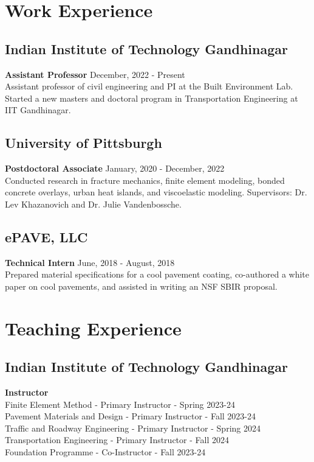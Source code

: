 \documentclass[12pt]{article}
\begin{document}
\bigskip
\section*{Work Experience}
\hfill
\subsection*{Indian Institute of Technology Gandhinagar}
\textbf{Assistant Professor} \hfill December, 2022 - Present \\
Assistant professor of civil engineering and PI at the Built Environment Lab. Started a new masters and doctoral program in Transportation Engineering at IIT Gandhinagar. \\

\subsection*{University of Pittsburgh}
\textbf{Postdoctoral Associate} \hfill January, 2020 - December, 2022 \\
Conducted research in fracture mechanics, finite element modeling, bonded concrete overlays, urban heat islands, and viscoelastic modeling. Supervisors: Dr. Lev Khazanovich and Dr. Julie Vandenbossche.\\

\subsection*{ePAVE, LLC}
\textbf{Technical Intern} \hfill June, 2018 - August, 2018 \\
Prepared material specifications for a cool pavement coating, co-authored a white paper on cool pavements, and assisted in writing an NSF SBIR proposal. 

\bigskip
\section*{Teaching Experience}
\hfill
\subsection*{Indian Institute of Technology Gandhinagar}
\textbf{Instructor}\\
Finite Element Method - Primary Instructor - Spring 2023-24 \\
Pavement Materials and Design - Primary Instructor - Fall 2023-24 \\
Traffic and Roadway Engineering - Primary Instructor - Spring 2024 \\
Transportation Engineering - Primary Instructor - Fall 2024 \\
Foundation Programme - Co-Instructor - Fall 2023-24
\end{document}
